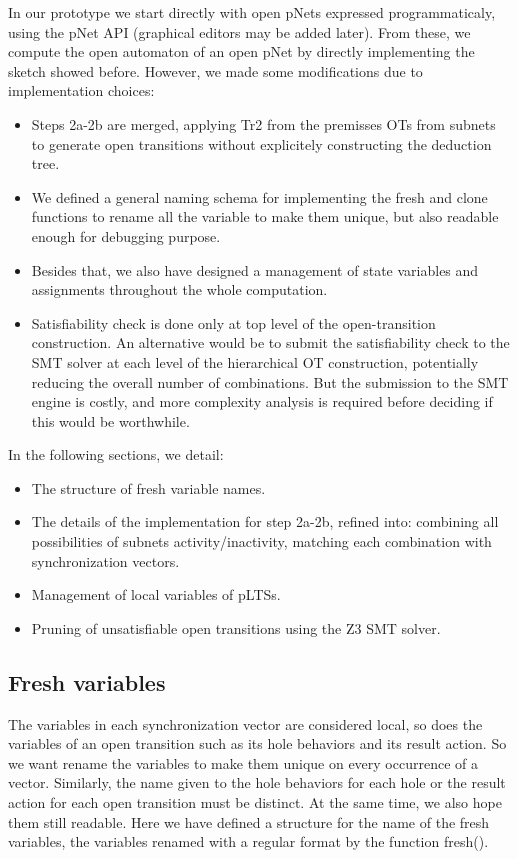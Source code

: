 \documentclass{lncs/llncs}
\begin{document}
In our prototype we start directly with open pNets expressed
programmaticaly, using the pNet API (graphical editors may be added
later). From these, we compute
the open automaton of an open pNet by directly
implementing the sketch showed before. However, we made some
modifications due to implementation choices:
\begin{itemize}
  \item Steps 2a-2b are merged, applying Tr2 from the
premisses OTs from subnets to generate open transitions without
explicitely constructing the deduction tree.
  \item We defined a general naming schema for implementing the fresh 
and clone functions to rename all the variable to make them unique, but also
readable enough for debugging purpose.
  \item Besides that, we also have designed a management of state variables and
    assignments throughout the whole computation.
  \item Satisfiability check is done only at
top level of the open-transition construction. An alternative would be
to submit the satisfiability check to the SMT solver at each level of
the hierarchical OT construction, potentially reducing the overall number of
combinations. But the submission to the SMT engine is costly, and more
complexity analysis is required before deciding if this would be
worthwhile. 
\end{itemize}

In the following sections, we detail:
\begin{itemize}
\item The structure of fresh variable names.
\item The details of the implementation for step 2a-2b, refined into:
  \subitem combining all possibilities of subnets activity/inactivity,
  \subitem matching each combination with synchronization vectors.
\item Management of local variables of pLTSs.
\item Pruning of unsatisfiable open transitions using the Z3 SMT solver.
\end{itemize}

  
  

\subsection{Fresh variables}

The variables in each synchronization vector are considered local, so
does the variables of an open transition such as its hole behaviors
and its result action. So we want rename the variables to make them
unique on every occurrence of a vector. Similarly, the name given to
the hole behaviors for each hole or the result action for each open
transition must be distinct. At the same time, we also hope them still
readable. Here we have defined a structure for the name of the fresh
variables, the variables renamed with a regular format by the function
fresh(). 
\end{document}
